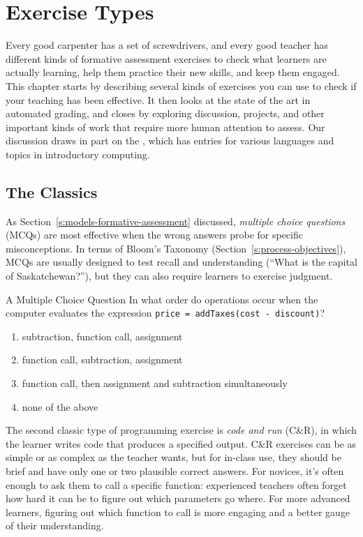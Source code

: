 \chapter{Exercise Types}\label{s:exercises}

Every good carpenter has a set of screwdrivers, and every good teacher
has different kinds of formative assessment exercises to check what
learners are actually learning, help them practice their new skills, and
keep them engaged. This chapter starts by describing several kinds of
exercises you can use to check if your teaching has been effective. It
then looks at the state of the art in automated grading, and closes by
exploring discussion, projects, and other important kinds of work that
require more human attention to assess. Our discussion draws in part on
the 
\cite{Sand2013}, which has entries for various languages and topics
in introductory computing.

\section{The Classics}\label{s:exercises-classics}

As Section~\ref{s:models-formative-assessment} discussed, \emph{multiple
choice questions} (MCQs) are most effective when the wrong answers probe
for specific misconceptions. In terms of Bloom's Taxonomy
(Section~\ref{s:process-objectives}), MCQs are usually designed to test
recall and understanding (``What is the capital of Saskatchewan?''), but
they can also require learners to exercise judgment.

\begin{aside}{A Multiple Choice Question}
  In what order do operations occur when the computer evaluates the
  expression \texttt{price\ =\ addTaxes(cost\ -\ discount)}?
  \begin{enumerate}
  \item
    subtraction, function call, assignment
  \item
    function call, subtraction, assignment
  \item
    function call, then assignment and subtraction simultaneously
  \item
    none of the above
  \end{enumerate}
\end{aside}

The second classic type of programming exercise is \emph{code and run}
(C\&R), in which the learner writes code that produces a specified
output. C\&R exercises can be as simple or as complex as the teacher
wants, but for in-class use, they should be brief and have only one or
two plausible correct answers. For novices, it's often enough to ask
them to call a specific function: experienced teachers often forget how
hard it can be to figure out which parameters go where. For more
advanced learners, figuring out which function to call is more engaging
and a better gauge of their understanding.

